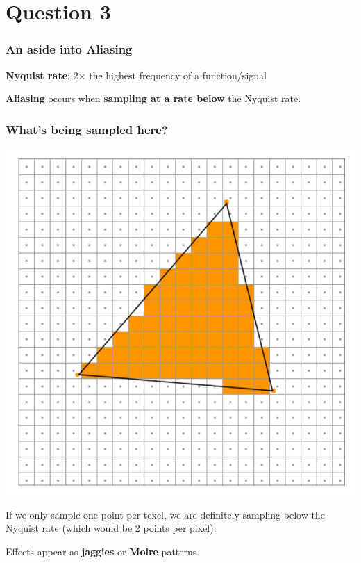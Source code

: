 \documentclass{beamer}
\begin{document}
\section{Question 3}

\begin{frame}
    \frametitle{An aside into \textbf{Aliasing}}

    \begin{tcolorbox}
        \textbf{Nyquist rate}: 2$\times$ the highest frequency of a function/signal
    \end{tcolorbox}
    \textbf{Aliasing} occurs when \textbf{sampling at a rate below} the Nyquist rate.

\end{frame}

\begin{frame}
    \frametitle{What's being sampled here?}

    \begin{center}
        \includegraphics[scale=0.3]{images/aliased-tri.png}
    \end{center}

    If we only sample one point per texel, we are definitely sampling below the Nyquist rate
    (which would be 2 points per pixel).

    Effects appear as \textbf{jaggies} or \textbf{Moire} patterns.

\end{frame}
\end{document}
